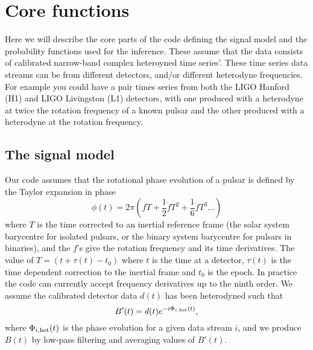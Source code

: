 \section{Core functions}

Here we will describe the core parts of the code defining the signal model and the probability functions used
for the inference. These assume that the data consists of calibrated narrow-band complex heteroyned time
series'. These time series data streams can be from different detectors, and/or different heterodyne
frequencies. For example you could have a pair times series from both the LIGO Hanford (H1) and LIGO
Livingston (L1) detectors, with one produced with a heterodyne at twice the rotation frequency of a known
pulsar and the other produced with a heterodyne at the rotation frequency.

\subsection{The signal model}

Our code assumes that the rotational phase evolution of a pulsar is defined by the Taylor expansion in phase
\begin{equation}
\phi(t) = 2\pi\left(fT + \frac{1}{2}\dot{f}T^2 + \frac{1}{6}\ddot{f}T^3  \ldots\right)
\end{equation}
where $T$ is the time corrected to an inertial reference frame (the solar system barycentre
for isolated pulsars, or the binary system barycentre for pulsars in binaries), and the $f$'s give
the rotation frequency and its time derivatives. The value of $T = (t+\tau(t)-t_0)$ where $t$ is the
time at a detector, $\tau(t)$ is the time dependent correction to the inertial frame and $t_0$ is the epoch.
In practice the code can currently accept frequency derivatives up to the ninth order. We assume the
calibrated detector data $d(t)$ has been heterodyned such that
\begin{equation}
B'(t) = d(t)e^{-i\Phi_{i,\rm het}(t)},
\end{equation}
where $\Phi_{i,\rm het}(t)$ is the phase evolution for a given data stream $i$, and we produce $B(t)$ by
low-pass filtering and averaging values of $B'(t)$.

